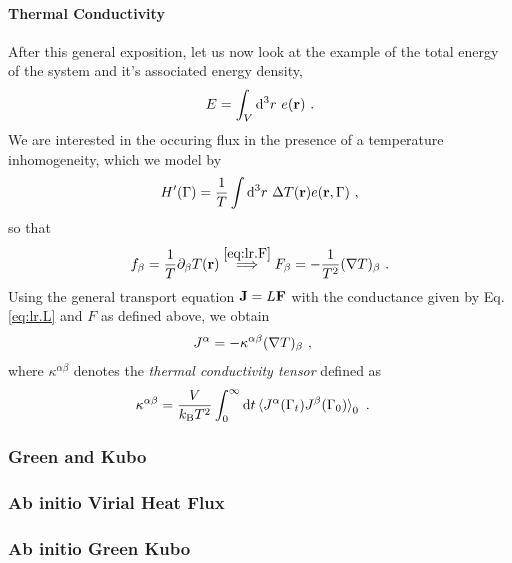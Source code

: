 \paragraph{Thermal Conductivity}
After this general exposition, let us now look at the example of the total energy of the system and it's associated energy density,
\begin{align}
	E = \int_V {\rm d}^3 r ~ e({\bf r})~.
	\label{eq:lr.E}
\end{align}
We are interested in the occuring flux in the presence of a temperature inhomogeneity, which we model by
\begin{align}
	H' (\Gamma) = \frac{1}{T} \int {\rm d}^3 r ~ \Delta T ({\bf r}) e({\bf r}, \Gamma)~,
	\label{eq:lr.Hp.temp}
\end{align}
so that
\begin{align}
	f_\beta = \frac{1}{T} \partial_\beta T ({\bf r}) 
		\stackrel{\eqref{eq:lr.F}}{\implies}
	F_\beta = - \frac{1}{T^2} ({\bf \nabla} T)_\beta ~.
	\label{eq:lr.F.temp}
\end{align}
Using the general transport equation ${\bf J} = L {\bf F}$ with the conductance given by Eq.\,\eqref{eq:lr.L} and $F$ as defined above, we obtain
\begin{align}
	J^\alpha 
		&= - \kappa^{\alpha \beta} ({\bf \nabla} T)_\beta~,
	\label{eq:lr.J.2}
\end{align}
where $\kappa^{\alpha \beta}$ denotes the \emph{thermal conductivity tensor} defined as
\begin{align}
	\kappa^{\alpha \beta}
		&=
		\frac{V}{k_{\rm B} T^2} \int_{0}^{\infty} 
		{\rm d} t \braket{J^\alpha (\Gamma_t) J^\beta (\Gamma_{0})}_0 ~.
\end{align}

\subsubsection{Green and Kubo}
\subsubsection{Ab initio Virial Heat Flux}
\subsubsection{Ab initio Green Kubo}